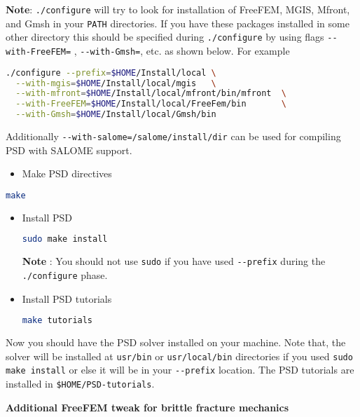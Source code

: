 \textbf{Note}: \lstinline!./configure! will try to look for installation
of FreeFEM, MGIS, Mfront, and Gmsh in your \lstinline!PATH! directories.
If you have these packages installed in some other directory this should
be specified during \lstinline!./configure! by using flags
\lstinline!--with-FreeFEM=! , \lstinline!--with-Gmsh=!, etc. as shown
below. For example

\begin{lstlisting}[language=bash]
./configure --prefix=$HOME/Install/local \
  --with-mgis=$HOME/Install/local/mgis   \
  --with-mfront=$HOME/Install/local/mfront/bin/mfront  \
  --with-FreeFEM=$HOME/Install/local/FreeFem/bin       \
  --with-Gmsh=$HOME/Install/local/Gmsh/bin        
\end{lstlisting}

Additionally \lstinline!--with-salome=/salome/install/dir! can be used
for compiling PSD with SALOME support.

\begin{itemize}
\tightlist
\item
  Make PSD directives
\end{itemize}

\begin{lstlisting}[language=bash]
make
\end{lstlisting}

\begin{itemize}
\item
  Install PSD

\begin{lstlisting}[language=bash]
sudo make install
\end{lstlisting}

  \textbf{Note} : You should not use \lstinline!sudo! if you have used
  \lstinline!--prefix! during the \lstinline!./configure! phase.
\item
  Install PSD tutorials

\begin{lstlisting}[language=bash]
make tutorials
\end{lstlisting}
\end{itemize}

Now you should have the PSD solver installed on your machine. Note that,
the solver will be installed at \lstinline!usr/bin! or
\lstinline!usr/local/bin! directories if you used
\lstinline!sudo make install! or else it will be in your
\lstinline!--prefix! location. The PSD tutorials are installed in
\lstinline!$HOME/PSD-tutorials!.

\textbf{Additional FreeFEM tweak for brittle fracture mechanics}

